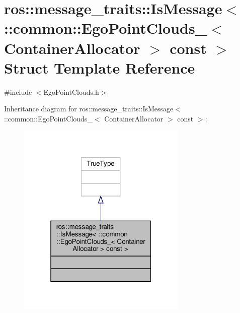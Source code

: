 \hypertarget{structros_1_1message__traits_1_1IsMessage_3_01_1_1common_1_1EgoPointClouds___3_01ContainerAllocator_01_4_01const_01_4}{}\section{ros\+:\+:message\+\_\+traits\+:\+:Is\+Message$<$ \+:\+:common\+:\+:Ego\+Point\+Clouds\+\_\+$<$ Container\+Allocator $>$ const $>$ Struct Template Reference}
\label{structros_1_1message__traits_1_1IsMessage_3_01_1_1common_1_1EgoPointClouds___3_01ContainerAllocator_01_4_01const_01_4}


{\ttfamily \#include $<$Ego\+Point\+Clouds.\+h$>$}



Inheritance diagram for ros\+:\+:message\+\_\+traits\+:\+:Is\+Message$<$ \+:\+:common\+:\+:Ego\+Point\+Clouds\+\_\+$<$ Container\+Allocator $>$ const $>$\+:\nopagebreak
\begin{figure}[H]
\begin{center}
\leavevmode
\includegraphics[width=229pt]{d2/d00/structros_1_1message__traits_1_1IsMessage_3_01_1_1common_1_1EgoPointClouds___3_01ContainerAlloca702d0b1cf3edaabb0d3d2d89f156573c}
\end{center}
\end{figure}


